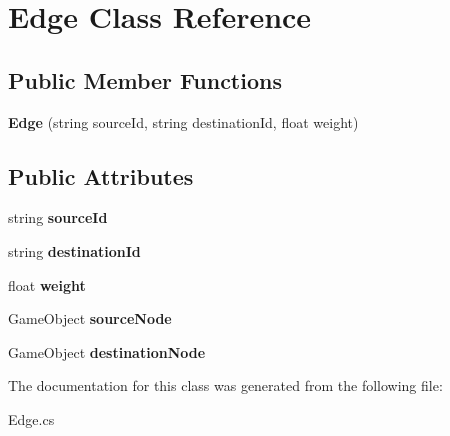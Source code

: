 \hypertarget{class_edge}{}\section{Edge Class Reference}
\label{class_edge}
\subsection*{Public Member Functions}
\begin{DoxyCompactItemize}
\item 
\mbox{\label{class_edge_a1867587ded1c86a8a25522c439cc0819}} 
{\bfseries Edge} (string source\+Id, string destination\+Id, float weight)
\end{DoxyCompactItemize}
\subsection*{Public Attributes}
\begin{DoxyCompactItemize}
\item 
\mbox{\label{class_edge_a5c34f3dea56d5a6cf779e5bc5ed66a0a}} 
string {\bfseries source\+Id}
\item 
\mbox{\label{class_edge_af391fb185ebf63f9fbe739fc4a9dce96}} 
string {\bfseries destination\+Id}
\item 
\mbox{\label{class_edge_a636623fec3bbf96668dc83eac1d5372e}} 
float {\bfseries weight}
\item 
\mbox{\label{class_edge_a1892e746667498d01636a6b43f61d60d}} 
Game\+Object {\bfseries source\+Node}
\item 
\mbox{\label{class_edge_ad1a278a3150479e7e3aada20f6cf70a5}} 
Game\+Object {\bfseries destination\+Node}
\end{DoxyCompactItemize}


The documentation for this class was generated from the following file\+:\begin{DoxyCompactItemize}
\item 
Edge.\+cs\end{DoxyCompactItemize}
